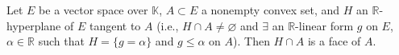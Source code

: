Let $E$ be a vector space over $\mathbb{K}$, $A \subset E$ a nonempty convex set, and $H$ an $\mathbb{R}$-hyperplane of $E$ tangent to $A$ (i.e., $H \cap A \neq \varnothing$ and $\exists$ an $\mathbb{R}$-linear form $g$ on $E$, $\alpha \in \mathbb{R}$ such that $H = \{g = \alpha\}$ and $g \leq \alpha$ on $A$). Then $H \cap A$ is a face of $A$.
